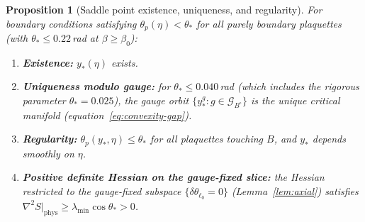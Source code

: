 \documentclass[11pt]{article}
\newtheorem{proposition}[theorem]{Proposition}
\theoremstyle{definition}
\begin{document}
\begin{proposition}[Saddle point existence, uniqueness, and regularity]
\label{prop:saddle}
For boundary conditions satisfying $\theta_p(\eta)<\theta_*$ for all
purely boundary plaquettes (with $\theta_*\le 0.22$\,rad at $\beta\ge\beta_0$):
\begin{enumerate}[nosep,label=(\roman*)]
\item \textbf{Existence:} $y_*(\eta)$ exists.
\item \textbf{Uniqueness modulo gauge:} for $\theta_*\le 0.040$\,rad
(which includes the rigorous parameter $\theta_*=0.025$),
the gauge orbit
$\{y_*^g:g\in\mathcal{G}_{B^\circ}\}$ is the unique critical manifold
(equation~\eqref{eq:convexity-gap}).
\item \textbf{Regularity:} $\theta_p(y_*,\eta)\le\theta_*$ for all
plaquettes touching $B$, and $y_*$ depends smoothly on $\eta$.
\item \textbf{Positive definite Hessian on the gauge-fixed slice:} the Hessian
restricted to the gauge-fixed subspace $\{\delta\theta_{\ell_0}=0\}$
(Lemma~\ref{lem:axial}) satisfies
$\nabla^2 S|_{\mathrm{phys}}\ge\lambda_{\min}\cos\theta_*>0$.
\end{enumerate}
\end{proposition}
\end{document}
